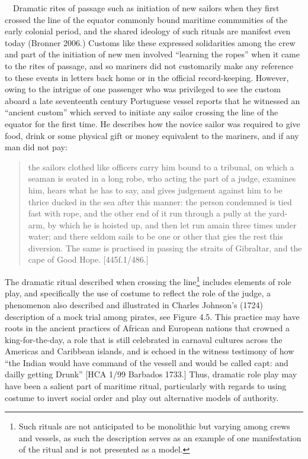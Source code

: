 \documentclass[12pt]{article}
\newenvironment{styleStandard}{\renewcommand\baselinestretch{1.0}\setlength\leftskip{0cm}\setlength\rightskip{0cm plus 1fil}\setlength\parindent{0cm}\setlength\parfillskip{0pt plus 1fil}\setlength\parskip{0in plus 1pt}\writerlistparindent\writerlistleftskip\leavevmode\normalfont\normalsize\writerlistlabel\ignorespaces}{\unskip\vspace{0in plus 1pt}\par}
\newcommand\writerlistleftskip{}
\newcommand\writerlistparindent{}
\newcommand\writerlistlabel{}
\begin{document}
\begin{styleStandard}
\ \ Dramatic rites of passage such as initiation of new sailors when they first crossed the line of the equator commonly bound maritime communities of the early colonial period, and the shared ideology of such rituals are manifest even today (Bronner 2006.) Customs like these expressed solidarities among the crew and part of the initiation of new men involved “learning the ropes” when it came to the rites of passage, and so mariners did not customarily make any reference to these events in letters back home or in the official record-keeping. However, owing to the intrigue of one passenger who was privileged to see the custom aboard a late seventeenth century Portuguese vessel reports that he witnessed an “ancient custom” which served to initiate any sailor crossing the line of the equator for the first time. He describes how the novice sailor was required to give food, drink or some physical gift or money equivalent to the mariners, and if any man did not pay: 
\end{styleStandard}


\begin{quotation}
the sailors clothed like officers carry him bound to a tribunal, on which a seaman is seated in a long robe, who acting the part of a judge, examines him, hears what he has to say, and gives judgement against him to be thrice ducked in the sea after this manner: the person condemned is tied fast with rope, and the other end of it run through a pully at the yard-arm, by which he is hoisted up, and then let run amain three times under water; and there seldom sails to be one or other that gies the rest this diversion. The same is practised in passing the straits of Gibraltar, and the cape of Good Hope. [445f.1/486.] 

\end{quotation}
\begin{styleStandard}
The dramatic ritual described when crossing the line\footnote{ Such rituals are not anticipated to be monolithic but varying among crews and vessels, as such the description serves as an example of one manifestation of the ritual and is not presented as a model. } includes elements of role play, and specifically the use of costume to reflect the role of the judge, a phenomenon also described and illustrated in Charles Johnson’s (1724) description of a mock trial among pirates, see Figure 4.5. This practice may have roots in the ancient practices of African and European nations that crowned a king-for-the-day, a role that is still celebrated in carnaval cultures across the Americas and Caribbean islands, and is echoed in the witness testimony of how “the Indian would have command of the vessell and would be called capt: and dailly getting Drunk” [HCA 1/99 Barbados 1733.] Thus, dramatic role play may have been a salient part of maritime ritual, particularly with regards to using costume to invert social order and play out alternative models of authority. 
\end{styleStandard}
\end{document}
